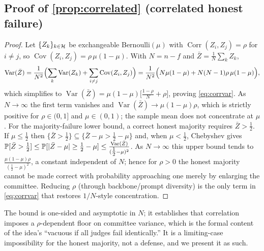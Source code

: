 \subsection{Proof of \cref{prop:correlated} (correlated honest failure)}
\begin{proof}
Let $\{Z_k\}_{k\in\mathcal{H}}$ be exchangeable Bernoulli$(\mu)$ with
$\operatorname{Corr}(Z_i,Z_j)=\rho$ for $i\ne j$, so
$\operatorname{Cov}(Z_i,Z_j)=\rho\,\mu(1-\mu)$. With $N=n-f$ and
$\bar Z=\frac1N\sum_{k}Z_k$,
\begin{equation}
  \operatorname{Var}(\bar Z)
  = \frac{1}{N^2}\Bigl(\sum_k\operatorname{Var}(Z_k) + \sum_{i\ne j}\operatorname{Cov}(Z_i,Z_j)\Bigr)
  = \frac{1}{N^2}\Bigl(N\mu(1-\mu) + N(N-1)\rho\,\mu(1-\mu)\Bigr),
\end{equation}
which simplifies to $\operatorname{Var}(\bar Z)=\mu(1-\mu)\bigl[\tfrac{1-\rho}{N}+\rho\bigr]$,
proving \cref{eq:corrvar}. As $N\to\infty$ the first term vanishes and
$\operatorname{Var}(\bar Z)\to\mu(1-\mu)\rho$, which is strictly positive for
$\rho\in(0,1]$ and $\mu\in(0,1)$; the sample mean does not concentrate at $\mu$. For the
majority-failure lower bound, a correct honest majority requires $\bar Z>\tfrac12$. If
$\mu\le\tfrac12$ then $\{\bar Z>\tfrac12\}\subseteq\{\bar Z-\mu>\tfrac12-\mu\}$ and, when
$\mu<\tfrac12$, Chebyshev gives
$\mathbb{P}[\bar Z>\tfrac12]\le \mathbb{P}[|\bar Z-\mu|\ge\tfrac12-\mu] \le
\frac{\operatorname{Var}(\bar Z)}{(\tfrac12-\mu)^2}$. As $N\to\infty$ this upper bound tends
to $\frac{\mu(1-\mu)\rho}{(\tfrac12-\mu)^2}$, a constant independent of $N$; hence for
$\rho>0$ the honest majority cannot be made correct with probability approaching one merely
by enlarging the committee. Reducing $\rho$ (through backbone/prompt diversity) is the only
term in \cref{eq:corrvar} that restores $1/N$-style concentration. \qedhere
\end{proof}

\begin{remark}
The bound is one-sided and asymptotic in $N$; it establishes that correlation imposes a
$\rho$-dependent floor on committee variance, which is the formal content of the idea's
``vacuous if all judges fail identically.'' It is a limiting-case impossibility for the
honest majority, not a defense, and we present it as such.
\end{remark}

